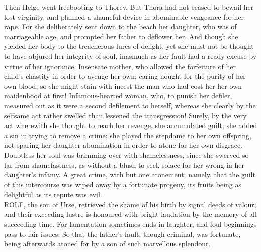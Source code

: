 \documentclass[10pt,a4paper]{report}
\begin{document}
Then Helge went freebooting to Thorey. But Thora had not ceased to bewail her lost virginity, and planned a shameful device in abominable vengeance for her rape. For she deliberately sent down to the beach her daughter, who was of marriageable age, and prompted her father to deflower her. And though she yielded her body to the treacherous lures of delight, yet she must not be thought to have abjured her integrity of soul, inasmuch as her fault had a ready excuse by virtue of her ignorance. Insensate mother, who allowed the forfeiture of her child's chastity in order to avenge her own; caring nought for the purity of her own blood, so she might stain with incest the man who had cost her her own maidenhood at first! Infamous-hearted woman, who, to punish her defiler, measured out as it were a second defilement to herself, whereas she clearly by the selfsame act rather swelled than lessened the transgression! Surely, by the very act wherewith she thought to reach her revenge, she accumulated guilt; she added a sin in trying to remove a crime: she played the stepdame to her own offspring, not sparing her daughter abomination in order to atone for her own disgrace. Doubtless her soul was brimming over with shamelessness, since she swerved so far from shamefastness, as without a blush to seek solace for her wrong in her daughter's infamy. A great crime, with but one atonement; namely, that the guilt of this intercourse was wiped away by a fortunate progeny, its fruits being as delightful as its repute was evil.\\

ROLF, the son of Urse, retrieved the shame of his birth by signal deeds of valour; and their exceeding lustre is honoured with bright laudation by the memory of all succeeding time. For lamentation sometimes ends in laughter, and foul beginnings pass to fair issues. So that the father's fault, though criminal, was fortunate, being afterwards atoned for by a son of such marvellous splendour.\\
\end{document}
